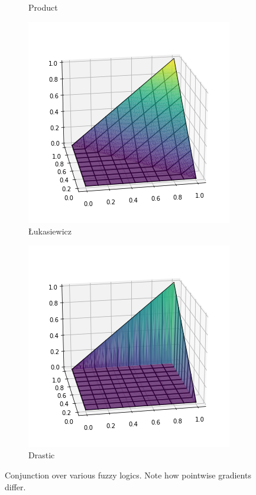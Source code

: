\begin{figure}[h]
\begin{subfigure}[b]{0.2\textwidth}
        \caption{Product}
        \label{fig:prodconj}
    \end{subfigure}
    \begin{subfigure}[b]{0.2\textwidth}
        \centering
        \includegraphics[width=\textwidth]{imgs/fuzzy_luk_and.png}
        \caption{Łukasiewicz}
        \label{fig:lukconj}
    \end{subfigure}
    \begin{subfigure}[b]{0.2\textwidth}
        \centering
        \includegraphics[width=\textwidth]{imgs/fuzzy_dra_and.png}
        \caption{Drastic}
        \label{fig:draconj}
    \end{subfigure}
       \caption{Conjunction over various fuzzy logics. Note how pointwise gradients differ.}
       \label{fig:conjplots}
\end{figure}

